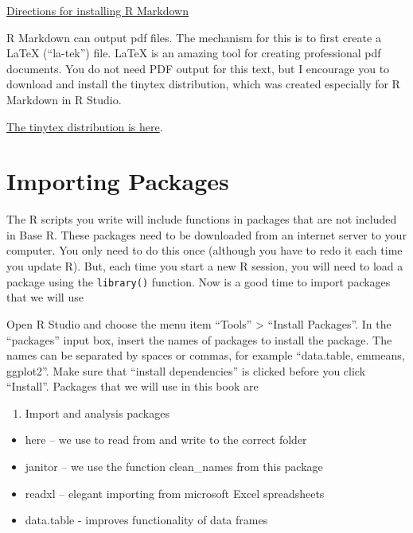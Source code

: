 \documentclass[]{book}
\providecommand{\tightlist}{%
  \setlength{\itemsep}{0pt}\setlength{\parskip}{0pt}}
\begin{document}
\href{https://bookdown.org/yihui/rmarkdown/installation.html\#installation}{Directions for installing R Markdown}

R Markdown can output pdf files. The mechanism for this is to first create a LaTeX (``la-tek'') file. LaTeX is an amazing tool for creating professional pdf documents. You do not need PDF output for this text, but I encourage you to download and install the tinytex distribution, which was created especially for R Markdown in R Studio.

\href{https://yihui.org/tinytex/}{The tinytex distribution is here}.

\hypertarget{importing-packages}{%
\section{Importing Packages}\label{importing-packages}}

The R scripts you write will include functions in packages that are not included in Base R. These packages need to be downloaded from an internet server to your computer. You only need to do this once (although you have to redo it each time you update R). But, each time you start a new R session, you will need to load a package using the \texttt{library()} function. Now is a good time to import packages that we will use

Open R Studio and choose the menu item ``Tools'' \textgreater{} ``Install Packages''. In the ``packages'' input box, insert the names of packages to install the package. The names can be separated by spaces or commas, for example ``data.table, emmeans, ggplot2''. Make sure that ``install dependencies'' is clicked before you click ``Install''. Packages that we will use in this book are

\begin{enumerate}
\def\labelenumi{\arabic{enumi}.}
\tightlist
\item
  Import and analysis packages
\end{enumerate}

\begin{itemize}
\tightlist
\item
  here -- we use to read from and write to the correct folder
\item
  janitor -- we use the function clean\_names from this package
\item
  readxl -- elegant importing from microsoft Excel spreadsheets
\item
  data.table - improves functionality of data frames
\end{itemize}
\end{document}
